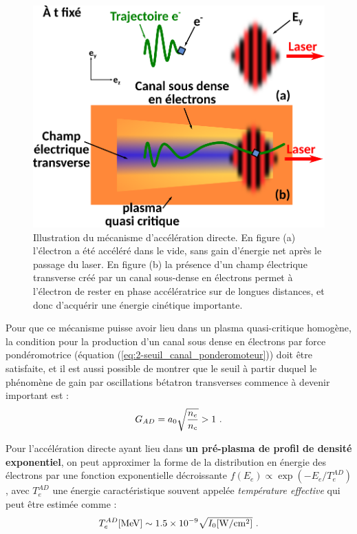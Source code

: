 \begin{refsection}
\begin{figure}[hbtp]
    \centering
    \includegraphics[width=0.6\linewidth]{2-laser/acceleration_directe.png}
    \caption{Illustration du mécanisme d'accélération directe. En figure (a) l'électron a été accéléré dans le vide, sans gain d'énergie net après le passage du laser. En figure (b) la présence d'un champ électrique transverse créé par un canal sous-dense en électrons permet à l'électron de rester en phase accélératrice sur de longues distances, et donc d'acquérir une énergie cinétique importante.}
    \label{fig:2-acceleration_directe}
\end{figure}

Pour que ce mécanisme puisse avoir lieu dans un plasma quasi-critique homogène, la condition pour la production d'un canal sous dense en électrons par force pondéromotrice (équation (\ref{eq:2-seuil_canal_ponderomoteur})) doit être satisfaite, et il est aussi possible de montrer \parencite{arefiev_2016} que le seuil à partir duquel le phénomène de gain par oscillations bétatron transverses commence à devenir important est :
\begin{equation}
    G_{AD} =a_0 \sqrt{\dfrac{n_e}{n_c}} > 1 ~ \rm .
\end{equation}

Pour l'accélération directe ayant lieu dans \textbf{un pré-plasma de profil de densité exponentiel}, on peut approximer la forme de la distribution en énergie des électrons par une fonction exponentielle décroissante $f(E_e) \propto \exp(-E_e/T_e^{AD})$, avec $T_e^{AD}$ une énergie caractéristique souvent appelée \textit{température effective} qui peut être estimée comme \parencite{pukhov_1999} :
\begin{equation}
    T_e^{AD} \si{[\MeV]}\sim 1.5 \times 10^{-9} \sqrt{I_0 \si{[\W\per\cm^2]}} ~ \rm .
\end{equation}


\end{refsection}
